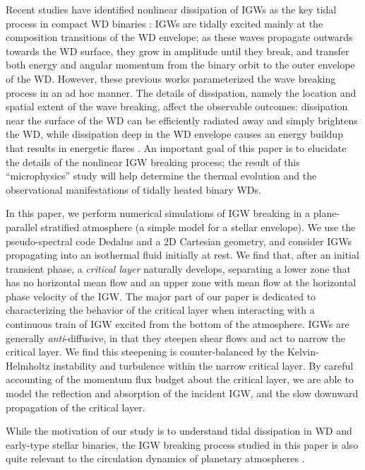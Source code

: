 \documentclass[
        fleqn,
        usenatbib,
    ]{mnras}
\begin{document}
Recent studies have identified nonlinear dissipation of IGWs as the key tidal
process in compact WD binaries \citep{fullerII,fullerIV,tidal_novae,bukart}:
IGWs are tidally excited mainly at the composition transitions of the WD
envelope; as these waves propagate outwards towards the WD surface, they grow in
amplitude until they break, and transfer both energy and angular momentum from
the binary orbit to the outer envelope of the WD\@. However, these previous
works parameterized the wave breaking process in an ad hoc manner. The details
of dissipation, namely the location and spatial extent of the wave breaking,
affect the observable outcomes: dissipation near the surface of the WD can be
efficiently radiated away and simply brightens the WD, while dissipation deep in
the WD envelope causes an energy buildup that results in energetic flares
\citep{tidal_novae}. An important goal of this paper is to elucidate the details
of the nonlinear IGW breaking process; the result of this ``microphysics'' study
will help determine the thermal evolution and the observational manifestations
of tidally heated binary WDs.

In this paper, we perform numerical simulations of IGW breaking in a
plane-parallel stratified atmosphere (a simple model for a stellar envelope). We
use the pseudo-spectral code Dedalus \citep{dedalus,dedalus2} and a 2D Cartesian
geometry, and consider IGWs propagating into an isothermal fluid initially at
rest. We find that, after an initial transient phase, a \emph{critical layer}
naturally develops, separating a lower zone that has no horizontal mean flow and
an upper zone with mean flow at the horizontal phase velocity of the IGW\@. The
major part of our paper is dedicated to characterizing the behavior of the
critical layer when interacting with a continuous train of IGW excited from the
bottom of the atmosphere. IGWs are generally \emph{anti}-diffusive, in that they
steepen shear flows \citep{lindzen_qbo,lecoanet_meanflow} and act to narrow the
critical layer. We find this steepening is counter-balanced by the
Kelvin-Helmholtz instability and turbulence within the narrow critical layer. By
careful accounting of the momentum flux budget about the critical layer, we are
able to model the reflection and absorption of the incident IGW, and the slow
downward propagation of the critical layer.

While the motivation of our study is to understand tidal dissipation in WD and
early-type stellar binaries, the IGW breaking process studied in this paper is
also quite relevant to the circulation dynamics of planetary atmospheres
\citep[see e.g.][]{lindzen1981turbulence,holton1983influence,baldwin2001quasi}.
\end{document}
